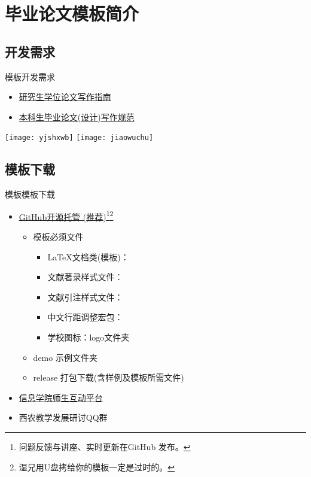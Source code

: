 \documentclass[fontset = adobe, xcolor=svgnames, t, aspectratio=169]{ctexbeamer}
\begin{document}
\section[\nwafuthesis]{\nwafuthesis 毕业论文模板简介}
\subsection[开发需求]{开发需求}
\begin{frame}[t]{\nwafuthesis 模板}{开发需求}
  \stretchon
  \begin{itemize}
  \item \href{https://yjshy.nwafu.edu.cn/xwgl/xwlwxzgf/index.htm}{研究生学位论文写作指南}
  \item \href{https://jiaowu.nwsuaf.edu.cn/tzgg/34321.htm}{本科生毕业论文(设计)写作规范}
  \end{itemize}
  \centering
  \texttt{[image: yjshxwb]}\quad
  \texttt{[image: jiaowuchu]}
  \stretchoff
\end{frame}

\subsection[模板下载]{模板下载}
\begin{frame}[t]{\nwafuthesis 模板}{模板下载}
  \stretchon
  \begin{itemize}
  \item \href{https://github.com/registor/nwafuthesis}{GitHub开源托管
      (\alert{推荐})}\footnote[frame]{问题反馈与讲座、实时更新在GitHub
      发布。}\footnote[frame]{湿兄用U盘拷给你的模板一定是过时的。}
    \begin{itemize}
    \item 模板必须文件
      \begin{itemize}
      \item \LaTeX 文档类(模板)： 
      \item 文献著录样式文件：
      \item 文献引注样式文件：
      \item 中文行距调整宏包：
      \item 学校图标：logo文件夹
      \end{itemize}
    \item demo 示例文件夹
    \item release 打包下载(含样例及模板所需文件)
    \end{itemize}
  \item \href{http://202.117.179.110/}{信息学院师生互动平台}
  \item 西农教学发展研讨QQ群
  \end{itemize}
  \stretchoff
\end{frame}
\end{document}
